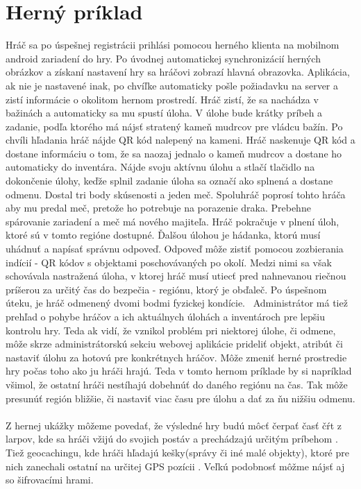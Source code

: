 \section{Herný príklad}
Hráč sa po úspešnej registrácii prihlási pomocou herného klienta na mobilnom android zariadení do hry. Po úvodnej automatickej synchronizácií herných obrázkov a získaní nastavení hry sa hráčovi zobrazí hlavná obrazovka. Aplikácia, ak nie je nastavené inak, po chvíľke automaticky pošle požiadavku na server a zistí informácie o okolitom hernom prostredí. Hráč zistí, že sa nachádza v bažinách a automaticky  sa mu spustí úloha. V úlohe bude krátky príbeh a zadanie, podľa ktorého má nájsť stratený kameň mudrcov pre vládcu bažín. Po chvíli hľadania hráč nájde QR kód nalepený na kameni. Hráč naskenuje QR kód a dostane informáciu o tom, že sa naozaj jednalo o kameň mudrcov a dostane ho automaticky do inventára. Nájde svoju aktívnu úlohu a stlačí tlačidlo na dokončenie úlohy, keďže splnil zadanie úloha sa označí ako splnená a dostane odmenu. Dostal tri body skúsenosti a jeden meč. Spoluhráč poprosí tohto hráča aby mu predal meč, pretože ho potrebuje na porazenie draka. Prebehne spárovanie zariadení a meč má nového majiteľa. Hráč pokračuje v plnení úloh, ktoré sú v tomto regióne dostupné. Ďalšou úlohou je hádanka, ktorú musí uhádnuť a napísať správnu odpoveď. Odpoveď môže zistiť pomocou zozbierania indícií - QR kódov s objektami poschovávaných po okolí. Medzi nimi sa však schovávala nastražená úloha, v ktorej hráč musí utiecť pred nahnevanou riečnou príšerou za určitý čas do bezpečia - regiónu, ktorý je obďaleč. Po úspešnom úteku, je hráč odmenený dvomi bodmi fyzickej kondície. \
Administrátor má tiež prehľad o pohybe hráčov a ich aktuálnych úlohách a inventároch pre lepšiu kontrolu hry. Teda ak vidí, že vznikol problém pri niektorej úlohe, či odmene, môže skrze administrátorskú sekciu webovej aplikácie prideliť objekt, atribút či nastaviť úlohu za hotovú pre konkrétnych hráčov. Môže zmeniť herné prostredie hry počas toho ako ju hráči hrajú. Teda v tomto hernom príklade by si napríklad všimol, že ostatní hráči nestíhajú dobehnúť do daného regiónu na čas. Tak môže presunúť región bližšie, či nastaviť viac času pre úlohu a dať za ňu nižšiu odmenu.

\paragraph{}
Z hernej ukážky môžeme povedať, že výsledné hry budú môcť čerpať časť čŕt z larpov, kde sa hráči vžijú do svojich postáv a prechádzajú určitým príbehom \cite{larp-cojeto}. Tiež geocachingu, kde hráči hľadajú kešky(správy či iné malé objekty), ktoré pre nich zanechali ostatní na určitej GPS pozícii \cite{geocaching}. Veľkú podobnosť môžme nájsť aj so šifrovacími hrami. 


